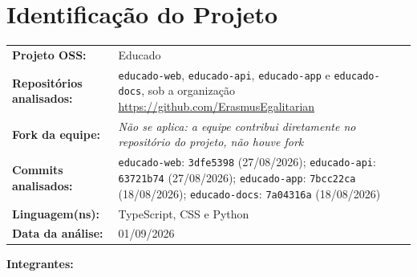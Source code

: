 \section*{Identificação do Projeto}

\begin{tabularx}{\textwidth}{>{\bfseries}l X}
Projeto OSS: & Educado \\[0.2cm]
Repositórios analisados:
& \texttt{educado-web}, \texttt{educado-api}, \texttt{educado-app} e
\texttt{educado-docs}, sob a organização
\url{https://github.com/ErasmusEgalitarian} \cite{educado-repos} \\[0.2cm]
Fork da equipe:
& \textit{Não se aplica: a equipe contribui diretamente no repositório do projeto, não houve fork} \\[0.2cm]
Commits analisados:
& \texttt{educado-web}: \texttt{3dfe5398} (27/08/2026);
\texttt{educado-api}: \texttt{63721b74} (27/08/2026);
\texttt{educado-app}: \texttt{7bcc22ca} (18/08/2026);
\texttt{educado-docs}: \texttt{7a04316a} (18/08/2026) \\[0.2cm]
Linguagem(ns):
& TypeScript, CSS e Python \\[0.2cm]
Data da análise:
& 01/09/2026
\end{tabularx}

\vspace{0.5cm}

\noindent
\textbf{Integrantes:}

\begingroup
\renewcommand{\integrante}[2]{\item #1, #2}
\begin{itemize}
    \listaintegrantes
\end{itemize}
\endgroup

\newpage
